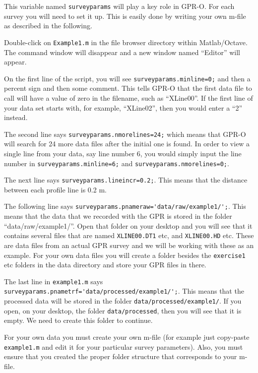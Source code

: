 \documentclass[11pt]{article}
\begin{document}
This variable named \verb#surveyparams# will play a key role in
GPR-O. For each survey you will need to set it up. This is easily
done by writing your own m-file as described in the following.

Double-click on \verb#Example1.m# in the file browser directory within
Matlab/Octave.  The command window will disappear and a new window
named ``Editor'' will appear.

On the first line of the script, you will see \verb#surveyparams.minline=0;# 
and then a percent sign and then some comment. This tells GPR-O that the 
first data file to call will have a value of zero in the filename, such as ``XLine00''.
If the first line of your data set starts with, for example, ``XLine02'',
then you would enter a ``2'' instead.

The second line says \verb#surveyparams.nmorelines=24;# which means that
GPR-O will search for 24 more data files after the initial one is
found.  In order to view a single line from your data, say line number
6, you would simply input the line number in
\verb#surveyparams.minline=6;# and \verb#surveyparams.nmorelines=0;#.

The next line says \verb#surveyparams.lineincr=0.2;#. This means that the
distance between each profile line is 0.2 m.

The following line says
\verb#surveyparams.pnameraw='data/raw/example1/';#. This means that the
data that we recorded with the GPR is stored in the folder
``data/raw/example1/''. Open that folder on your desktop and you will
see that it contains several files that are named \verb#XLINE00.DT1# etc,
and \verb#XLINE00.HD# etc. These are data files from an actual GPR survey 
and we will be working with these as an example. For your own data files 
you will create a folder besides the \verb#exercise1# etc folders in the data 
directory and store your GPR files in there.

The last line in \verb#example1.m# says
\verb#surveyparams.pnametrf='data/processed/example1/';#. This means that
the processed data will be stored in the folder
\verb#data/processed/example1/#. If you open, on your desktop, the folder
\verb#data/processed#, then you will see that it is empty. We need to
create this folder to continue.

For your own data you must create your own m-file (for example just copy-paste 
\verb#example1.m# and edit it for your particular survey parameters).
Also, you must ensure that you created the proper folder structure 
that corresponds to your m-file.
\end{document}
